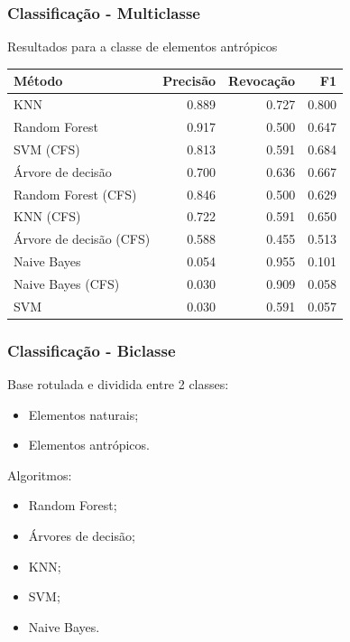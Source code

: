 \documentclass[t]{beamer}
\begin{document}
\begin{frame}[c]
	\frametitle{Classificação - Multiclasse}

	\centering
	Resultados para a classe de elementos antrópicos

	\small{
		\begin{table}[h]
		\centering
		\begin{tabulary}{\linewidth}{|L|R|R|R|}
		\hline
		\textbf{Método} & \textbf{Precisão} & \textbf{Revocação} & \textbf{F1} \\ \hline
		KNN                     & 0.889 & 0.727 & 0.800 \\ \hline
		Random Forest           & 0.917 & 0.500 & 0.647 \\ \hline
		SVM (CFS)               & 0.813 & 0.591 & 0.684 \\ \hline
		Árvore de decisão       & 0.700 & 0.636 & 0.667 \\ \hline
		Random Forest (CFS)     & 0.846 & 0.500 & 0.629 \\ \hline
		KNN (CFS)               & 0.722 & 0.591 & 0.650 \\ \hline
		Árvore de decisão (CFS) & 0.588 & 0.455 & 0.513 \\ \hline
		Naive Bayes             & 0.054 & 0.955 & 0.101 \\ \hline
		Naive Bayes (CFS)       & 0.030 & 0.909 & 0.058 \\ \hline
		SVM                     & 0.030 & 0.591 & 0.057 \\ \hline
		\end{tabulary}
		\end{table}
	}
\end{frame}


\begin{frame}[c]
	\frametitle{Classificação - Biclasse}

	Base rotulada e dividida entre 2 classes:
	\vspace{0.3cm}
	\begin{itemize}
		\item Elementos naturais;
		\item Elementos antrópicos.
	\end{itemize}

	\vspace{0.5cm}

	Algoritmos:
	\begin{itemize}
		\item Random Forest;
		\item Árvores de decisão;
		\item KNN;
		\item SVM;
		\item Naive Bayes.
	\end{itemize}

\end{frame}
\end{document}
